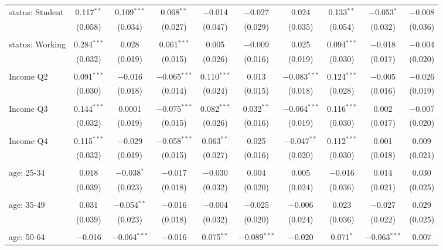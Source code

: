 \begin{tabular}{@{\extracolsep{5pt}}lccccccccc}
 status: Student & 0.117$^{**}$ & 0.109$^{***}$ & 0.068$^{**}$ & $-$0.014 & $-$0.027 & 0.024 & 0.133$^{**}$ & $-$0.053$^{*}$ & $-$0.008 \\ 
  & (0.058) & (0.034) & (0.027) & (0.047) & (0.029) & (0.035) & (0.054) & (0.032) & (0.036) \\ 
  & & & & & & & & & \\ 
 status: Working & 0.284$^{***}$ & 0.028 & 0.061$^{***}$ & 0.005 & $-$0.009 & 0.025 & 0.094$^{***}$ & $-$0.018 & $-$0.004 \\ 
  & (0.032) & (0.019) & (0.015) & (0.026) & (0.016) & (0.019) & (0.030) & (0.017) & (0.020) \\ 
  & & & & & & & & & \\ 
 Income Q2 & 0.091$^{***}$ & $-$0.016 & $-$0.065$^{***}$ & 0.110$^{***}$ & 0.013 & $-$0.083$^{***}$ & 0.124$^{***}$ & $-$0.005 & $-$0.026 \\ 
  & (0.030) & (0.018) & (0.014) & (0.024) & (0.015) & (0.018) & (0.028) & (0.016) & (0.019) \\ 
  & & & & & & & & & \\ 
 Income Q3 & 0.144$^{***}$ & 0.0001 & $-$0.075$^{***}$ & 0.082$^{***}$ & 0.032$^{**}$ & $-$0.064$^{***}$ & 0.116$^{***}$ & 0.002 & $-$0.007 \\ 
  & (0.032) & (0.019) & (0.015) & (0.026) & (0.016) & (0.019) & (0.030) & (0.017) & (0.020) \\ 
  & & & & & & & & & \\ 
 Income Q4 & 0.115$^{***}$ & $-$0.029 & $-$0.058$^{***}$ & 0.063$^{**}$ & 0.025 & $-$0.047$^{**}$ & 0.112$^{***}$ & 0.001 & 0.009 \\ 
  & (0.032) & (0.019) & (0.015) & (0.027) & (0.016) & (0.020) & (0.030) & (0.018) & (0.021) \\ 
  & & & & & & & & & \\ 
 age: 25-34 & 0.018 & $-$0.038$^{*}$ & $-$0.017 & $-$0.030 & 0.004 & 0.005 & $-$0.016 & 0.014 & 0.030 \\ 
  & (0.039) & (0.023) & (0.018) & (0.032) & (0.020) & (0.024) & (0.036) & (0.021) & (0.025) \\ 
  & & & & & & & & & \\ 
 age: 35-49 & 0.031 & $-$0.054$^{**}$ & $-$0.016 & $-$0.004 & $-$0.025 & $-$0.006 & 0.023 & $-$0.027 & 0.029 \\ 
  & (0.039) & (0.023) & (0.018) & (0.032) & (0.020) & (0.024) & (0.036) & (0.022) & (0.025) \\ 
  & & & & & & & & & \\ 
 age: 50-64 & $-$0.016 & $-$0.064$^{***}$ & $-$0.016 & 0.075$^{**}$ & $-$0.089$^{***}$ & $-$0.020 & 0.071$^{*}$ & $-$0.063$^{***}$ & 0.007 \\ 

\end{tabular}
